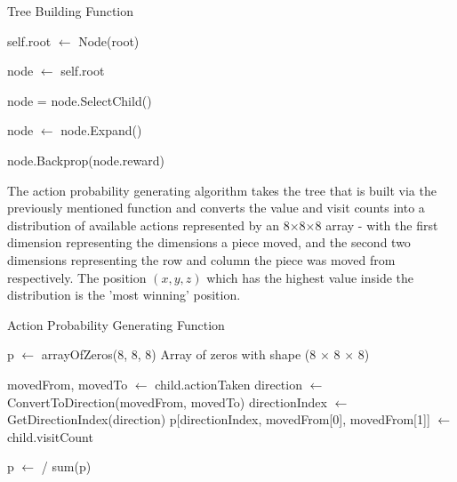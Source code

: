 \documentclass{article}
\begin{document}
    \begin{algorithm} 
        \caption{Tree Building Function}
        \begin{algorithmic}
            \State self.root $\gets$ Node(root)
            
                \State node $\gets$ self.root

                    \State node = node.SelectChild()
                \EndIf

                    \State node $\gets$ node.Expand()
                \EndWhile

                \State node.Backprop(node.reward)
            \EndFor
        \EndFunction
        \end{algorithmic}
    \end{algorithm}

    \pagebreak
    The action probability generating algorithm takes the tree that is built via the previously mentioned function and
    converts the value and visit counts into a distribution of available actions represented by an 8$\times$8$\times$8
    array - with the first dimension representing the dimensions a piece moved, and the second two dimensions representing
    the row and column the piece was moved from respectively. The position $\left(x,y,z\right)$ which has the highest value
    inside the distribution is the 'most winning' position.

    \begin{algorithm} 
        \caption{Action Probability Generating Function}
        \begin{algorithmic}
            \State p $\gets$ arrayOfZeros(8, 8, 8) \Comment Array of zeros with shape (8 $\times$ 8 $\times$ 8)
            
                \State movedFrom, movedTo $\gets$ child.actionTaken
                \State direction $\gets$ ConvertToDirection(movedFrom, movedTo)
                \State directionIndex $\gets$ GetDirectionIndex(direction)
                \State p[directionIndex, movedFrom[0], movedFrom[1]] $\gets$ child.visitCount
            \EndFor

            \State p $\gets$ / sum(p) 
        \EndFunction
        \end{algorithmic}
    \end{algorithm}
\end{document}
